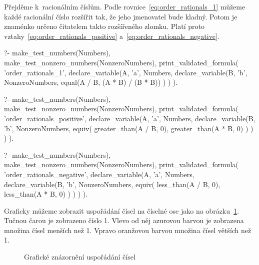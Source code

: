 Přejděme k~racionálním číslům. Podle rovnice~\eqref{eq:order_rationals_1} můžeme každé racionální číslo rozšířit tak, že jeho jmenovatel bude kladný. Potom je znaménko určeno čitatelem takto rozšířeného zlomku. Platí proto vztahy~\eqref{eq:order_rationals_positive} a~\eqref{eq:order_rationals_negative}.

\begin{prolog}
?-	make_test_numbers(Numbers),
	make_test_nonzero_numbers(NonzeroNumbers),
	print_validated_formula(
		'order_rationals_1',
		declare_variable(A, 'a', Numbers,
			declare_variable(B, 'b', NonzeroNumbers,
				equal(A / B, (A * B) / (B * B))
			)
		)
	).
\end{prolog}

\begin{fact}
\begin{prolog}
?-	make_test_numbers(Numbers),
	make_test_nonzero_numbers(NonzeroNumbers),
	print_validated_formula(
		'order_rationals_positive',
		declare_variable(A, 'a', Numbers,
			declare_variable(B, 'b', NonzeroNumbers,
				equiv(
					greater_than(A / B, 0),
					greater_than(A * B, 0)
				)
			)
		)
	).
\end{prolog}
\begin{prolog}
?-	make_test_numbers(Numbers),
	make_test_nonzero_numbers(NonzeroNumbers),
	print_validated_formula(
		'order_rationals_negative',
		declare_variable(A, 'a', Numbers,
			declare_variable(B, 'b', NonzeroNumbers,
				equiv(
					less_than(A / B, 0),
					less_than(A * B, 0)
				)
			)
		)
	).
\end{prolog}
\end{fact}

Graficky můžeme zobrazit uspořádání čísel na číselné ose jako na obrázku~\ref{img:ordering}. Tučnou čarou je zobrazeno číslo 1. Vlevo od něj azurovou barvou je zobrazena množina čísel menších než 1. Vpravo oranžovou barvou množina čísel větších než 1.

\begin{figure}[!h]
\centering
{}
\caption{Grafické znázornění uspořádání čísel}
\label{img:ordering}
\end{figure}

